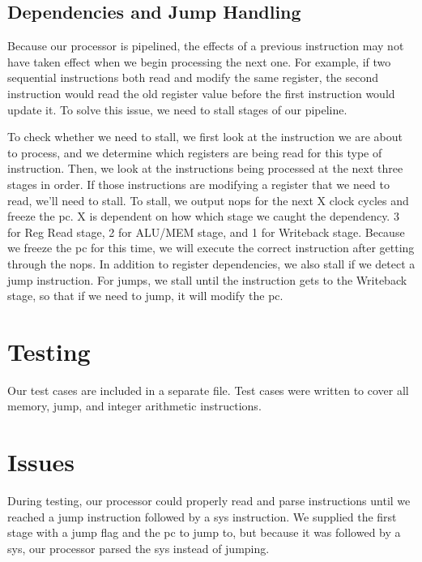 \documentclass[sigconf]{acmart}
\begin{document}
\subsection{Dependencies and Jump Handling}
Because our processor is pipelined, the effects of a previous instruction may not have taken effect when we begin processing the next one. For example, if two sequential instructions both read and modify the same register, the second instruction would read the old register value before the first instruction would update it. To solve this issue, we need to stall stages of our pipeline.

To check whether we need to stall, we first look at the instruction we are about to process, and we determine which registers are being read for this type of instruction. Then, we look at the instructions being processed at the next three stages in order. If those instructions are modifying a register that we need to read, we'll need to stall. To stall, we output nops for the next X clock cycles and freeze the pc. X is dependent on how which stage we caught the dependency. 3 for Reg Read stage, 2 for ALU/MEM stage, and 1 for Writeback stage. Because we freeze the pc for this time, we will execute the correct instruction after getting through the nops. In addition to register dependencies, we also stall if we detect a jump instruction. For jumps, we stall until the instruction gets to the Writeback stage, so that if we need to jump, it will modify the pc. 


\section{Testing}
Our test cases are included in a separate file. Test cases were written to cover all memory, jump, and integer arithmetic instructions. 

\section{Issues}
During testing, our processor could properly read and parse instructions until we reached a jump instruction followed by a sys instruction. We supplied the first stage with a jump flag and the pc to jump to, but because it was followed by a sys, our processor parsed the sys instead of jumping.
\end{document}
